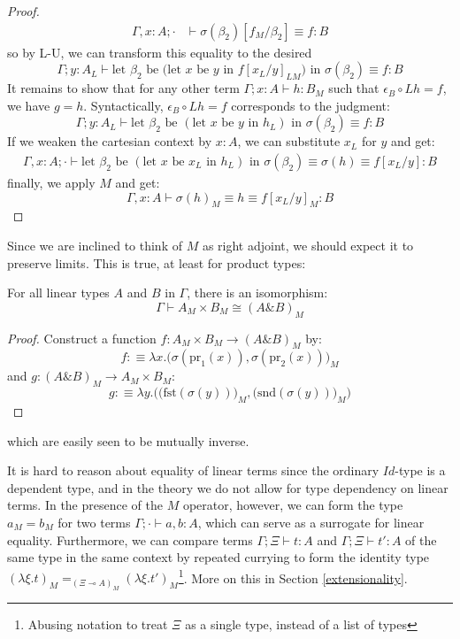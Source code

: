 \documentclass[a4paper,english]{lipics-v2018}
\begin{document}
\begin{theorem}[$L \dashv M$]
\begin{proof}
\[\begin{split}
    \Gamma, x : A; \cdot &\vdash \sigma(\beta_2)[f_M / \beta_2] \equiv f : B
  \end{split}
\]
so by L-U, we can transform this equality to the desired
\[
\Gamma; y : A_L \vdash \text{let $\beta_2$ be (let $x$ be $y$ in $f[x_L/y]_{LM}$) in }\sigma(\beta_2) \equiv f : B
\]
  It remains to show that for any other term $\Gamma; x : A \vdash h : B_M$ such that $\epsilon_B \circ Lh = f$, we have $g = h$. Syntactically, $\epsilon_B \circ Lh = f$  corresponds to the judgment:
  \[
    \Gamma; y : A_L \vdash \text{let $\beta_2$ be $(\text{let $x$ be $y$ in $h_L$})$ in }\sigma(\beta_2) \equiv f : B
  \]
  If we weaken the cartesian context by $x : A$, we can substitute $x_L$ for $y$ and get:
  \[
    \begin{split}
      \Gamma, x : A; \cdot \vdash \text{let $\beta_2$ be $(\text{let $x$ be $x_L$ in $h_L$})$ in }\sigma(\beta_2) \equiv \sigma(h) \equiv f[x_L/y] : B
    \end{split}
    \]
    finally, we apply $M$ and get:
    \[
      \Gamma, x : A \vdash \sigma(h)_M \equiv h \equiv f[x_L/y]_M : B
    \]
\end{proof}
\end{theorem}
Since we are inclined to think of $M$ as right adjoint, we should expect it to preserve limits. This is true, at least for product types:
\begin{theorem}For all linear types $A$ and $B$ in $\Gamma$, there is an isomorphism:
  \[
    \Gamma \vdash A_M \times B_M \cong (A \& B)_M
  \]
  \begin{proof}
    Construct a function $f : A_M \times B_M \to (A \& B)_M$ by:
    \[
      f :\equiv \lambda x. \Big (\sigma(\text{pr}_1(x)), \sigma(\text{pr}_2(x))\Big)_M
    \]
    and $g : (A \& B)_M \to A_M \times B_M$:
    \[
      g :\equiv \lambda y. \Big (\big(\text{fst}(\sigma(y))\big )_M, \big (\text{snd}(\sigma(y))\big)_M \Big)
    \]
  \end{proof}
which are easily seen to be mutually inverse.
\end{theorem}

It is hard to reason about equality of linear terms since the ordinary $Id$-type is a dependent type, and in the theory we do not allow for type dependency on linear terms. In the presence of the $M$ operator, however, we can form the type $a_M = b_M$ for two terms $\Gamma; \cdot \vdash a, b : A$, which can serve as a surrogate for linear equality. Furthermore, we can compare terms $\Gamma; \Xi \vdash t : A$ and $\Gamma; \Xi \vdash t' : A$ of the same type in the same context by repeated currying to form the identity type $(\lambda \xi . t)_M =_{(\Xi \multimap A)_M} (\lambda \xi. t')_M$\footnote{Abusing notation to treat $\Xi$ as a single type, instead of a list of types}. More on this in Section \ref{extensionality}.
\end{document}
